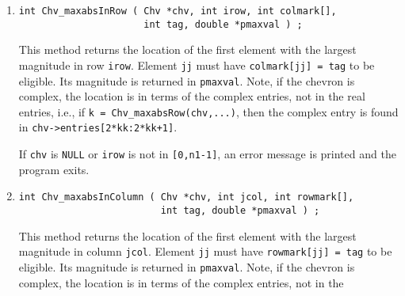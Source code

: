 \begin{enumerate}
\begin{verbatim}
int Chv_maxabsInColumn11 ( Chv *chv, int jcol, int rowmark[],
                           int tag, double *pmaxval ) ;
\end{verbatim}
This method returns the location of the first element with the
largest magnitude in column {\tt jcol} of the (1,1) block.
Element {\tt jj} must have {\tt rowmark[jj] = tag} to be eligible.
Its magnitude is returned in {\tt *pmaxval}.
Note, if the chevron is complex,
the location is in terms of the complex entries, not in the
real entries, i.e., if {\tt k = Chv\_maxabsColumn11(chv,...)},
then the complex entry is found in {\tt chv->entries[2*kk:2*kk+1]}.
\par {}
If {\tt chv} is {\tt NULL} or {\tt irow} is not in {\tt [0,n1-1]},
an error message is printed and the program exits.
\item
\begin{verbatim}
int Chv_maxabsInRow ( Chv *chv, int irow, int colmark[],
                      int tag, double *pmaxval ) ;
\end{verbatim}
This method returns the location of the first element with the
largest magnitude in row {\tt irow}.
Element {\tt jj} must have {\tt colmark[jj] = tag} to be eligible.
Its magnitude is returned in {\tt *pmaxval}.
Note, if the chevron is complex,
the location is in terms of the complex entries, not in the
real entries, i.e., if {\tt k = Chv\_maxabsRow(chv,...)},
then the complex entry is found in {\tt chv->entries[2*kk:2*kk+1]}.
\par {}
If {\tt chv} is {\tt NULL} or {\tt irow} is not in {\tt [0,n1-1]},
an error message is printed and the program exits.
\item
\begin{verbatim}
int Chv_maxabsInColumn ( Chv *chv, int jcol, int rowmark[],
                         int tag, double *pmaxval ) ;
\end{verbatim}
This method returns the location of the first element with the
largest magnitude in column {\tt jcol}.
Element {\tt jj} must have {\tt rowmark[jj] = tag} to be eligible.
Its magnitude is returned in {\tt *pmaxval}.
Note, if the chevron is complex,
the location is in terms of the complex entries, not in the

\end{enumerate}
